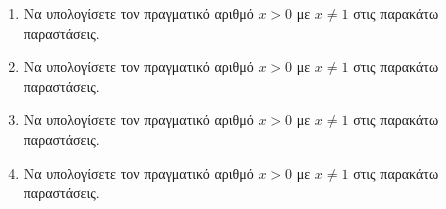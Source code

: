 \documentclass[twoside,nofonts,internet]{askhseis}
\begin{document}
\begin{enumerate}
\begin{multicols}{2}
\end{multicols}
\item Να υπολογίσετε τον πραγματικό αριθμό $ x>0$ με $ x\neq 1 $ στις παρακάτω παραστάσεις.
\begin{multicols}{2}
\end{multicols}
\item Να υπολογίσετε τον πραγματικό αριθμό $ x>0$ με $ x\neq 1 $ στις παρακάτω παραστάσεις.
\begin{multicols}{2}
\end{multicols}
\item Να υπολογίσετε τον πραγματικό αριθμό $ x>0$ με $ x\neq 1 $ στις παρακάτω παραστάσεις.
\begin{multicols}{2}
\end{multicols}
\item Να υπολογίσετε τον πραγματικό αριθμό $ x>0 $ με $ x\neq 1 $ στις παρακάτω παραστάσεις.

\end{enumerate}
\end{document}
